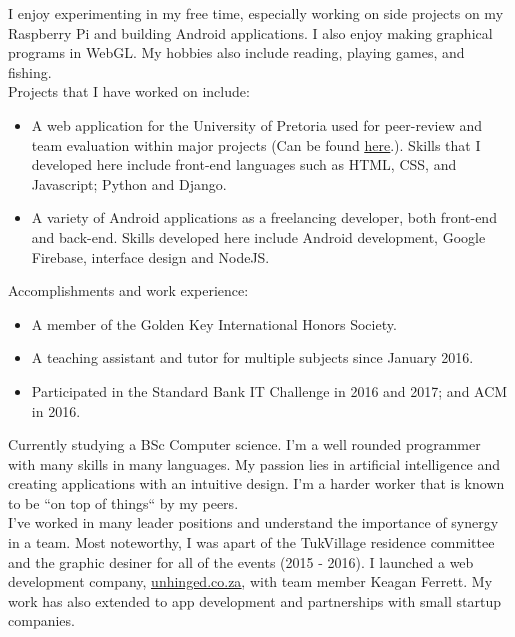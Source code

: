     I enjoy experimenting in my free time, especially working on side projects on my Raspberry Pi and building Android applications. I also enjoy making graphical programs in WebGL. My hobbies also include reading, playing games, and fishing. \\
    
    \noindent
    Projects that I have worked on include:
    \begin{itemize}
        \item A web application for the University of Pretoria used for peer-review and team evaluation within major projects (Can be found \href{https://github.com/teampinocchio/pinocchio/wiki}{\underline{here}}.). Skills that I developed here include front-end languages such as HTML, CSS, and Javascript; Python and Django.
    
        \item A variety of Android applications as a freelancing developer, both front-end and back-end. Skills developed here include Android development, Google Firebase, interface design and NodeJS.
    \end{itemize}
    
    \noindent
	Accomplishments and work experience:
    \begin{itemize}
        \item A member of the Golden Key International Honors Society.
        \item A teaching assistant and tutor for multiple subjects since January 2016.
        \item Participated in the Standard Bank IT Challenge in 2016 and 2017; and ACM in 2016.
    \end{itemize}

%
%
\newpage
{}
	Currently studying a BSc Computer science. I'm a well rounded programmer with many skills in many languages. My passion lies in artificial intelligence and creating applications with an intuitive design. I'm a harder worker that is known to be ``on top of things`` by my peers. \\ 

	I've worked in many leader positions and understand the importance of synergy in a team. Most noteworthy, I was apart of the TukVillage residence committee and the graphic desiner for all of the events (2015 - 2016). I launched a web development company, \href{www.unhinged.co.za}{\underline{unhinged.co.za}}, with team member Keagan Ferrett. My work has also extended to app development and partnerships with small startup companies.\\

